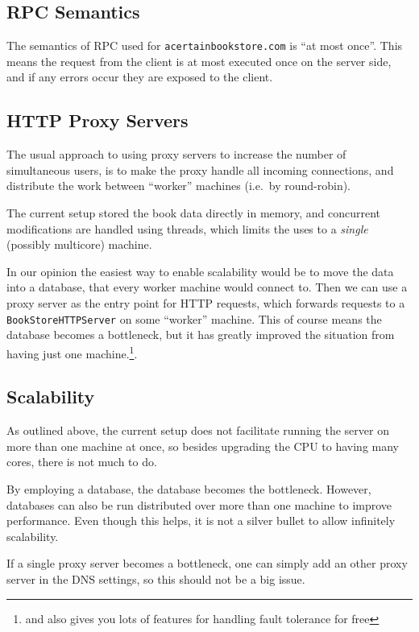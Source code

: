 \documentclass[11pt,a4paper,english]{article}
\begin{document}
\subsection{RPC Semantics}
The semantics of RPC used for \texttt{acertainbookstore.com} is ``at most
once''. This means the request from the client is at most executed once on the
server side, and if any errors occur they are exposed to the client.


\subsection{HTTP Proxy Servers}

The usual approach to using proxy servers to increase the number of simultaneous
users, is to make the proxy handle all incoming connections, and distribute the
work between ``worker'' machines (i.e.\ by round-robin).

The current setup stored the book data directly in memory, and concurrent
modifications are handled using threads, which limits the uses to a
\emph{single} (possibly multicore) machine.

In our opinion the easiest way to enable scalability would be to move the data
into a database, that every worker machine would connect to. Then we can use a
proxy server as the entry point for HTTP requests, which forwards requests to a
\texttt{BookStoreHTTPServer} on some ``worker'' machine. This of course means
the database becomes a bottleneck, but it has greatly improved the situation
from having just one machine.\footnote{and also gives you lots of features for
  handling fault tolerance for free}.

\subsection{Scalability}

As outlined above, the current setup does not facilitate running the server on
more than one machine at once, so besides upgrading the CPU to having many
cores, there is not much to do.

By employing a database, the database becomes the bottleneck. However, databases
can also be run distributed over more than one machine to improve
performance. Even though this helps, it is not a silver bullet to allow
infinitely scalability.

If a single proxy server becomes a bottleneck, one can simply add an other proxy
server in the DNS settings, so this should not be a big issue.
\end{document}
